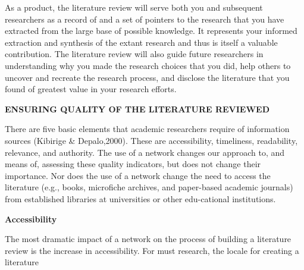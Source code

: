 \documentclass[a4,9pt]{beamer}
\begin{document}
\begin{frame}
\hspace*{0.5cm} As a product, the literature review will serve both you and subsequent researchers as a record of and a set of pointers to the research that you have extracted from the large base of possible knowledge. It represents your informed extraction and synthesis of the extant research and thus is itself a valuable contribution. The literature review will also guide future researchers in understanding why you made the research choices that you did, help others to uncover and recreate the research process, and disclose the literature that you found of greatest value in your research efforts.\\

\vspace*{0.5cm}
\end{frame}

\begin{frame}
\large{
\textbf{ENSURING QUALITY OF THE LITERATURE REVIEWED}
}
\vspace*{0.2cm}

\small{There are five basic elements that academic researchers require of information sources (Kibirige \& Depalo,2000). These are accessibility, timeliness, readability, relevance, and authority. The use of a network changes our approach to, and means of, assessing these quality indicators, but does not change their importance. Nor does the use of a network change the need to access the literature (e.g., books, microfiche archives, and paper-based academic journals) from established libraries at universities or other edu-cational institutions.\\
}

\vspace*{0.3cm}
\large{
\textbf{Accessibility}
}
\vspace*{0.2cm}

\small{The most dramatic impact of a network on the process of building a literature review is the increase in accessibility. For must research, the locale for creating a literature }

\end{frame}
\end{document}
